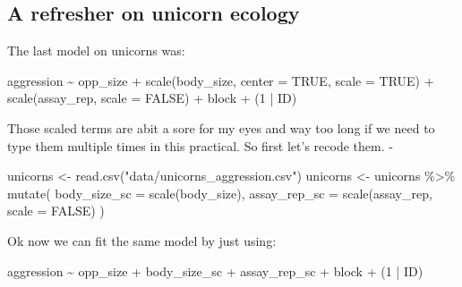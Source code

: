 \documentclass[
  12pt,
]{book}
\newenvironment{Shaded}{\begin{snugshade}}{\end{snugshade}}
\newcommand{\AttributeTok}[1]{\textcolor[rgb]{0.77,0.63,0.00}{#1}}
\newcommand{\ConstantTok}[1]{\textcolor[rgb]{0.00,0.00,0.00}{#1}}
\newcommand{\DecValTok}[1]{\textcolor[rgb]{0.00,0.00,0.81}{#1}}
\newcommand{\FunctionTok}[1]{\textcolor[rgb]{0.00,0.00,0.00}{#1}}
\newcommand{\NormalTok}[1]{#1}
\newcommand{\OtherTok}[1]{\textcolor[rgb]{0.56,0.35,0.01}{#1}}
\newcommand{\SpecialCharTok}[1]{\textcolor[rgb]{0.00,0.00,0.00}{#1}}
\newcommand{\StringTok}[1]{\textcolor[rgb]{0.31,0.60,0.02}{#1}}
\begin{document}
\hypertarget{a-refresher-on-unicorn-ecology}{%
\subsection{A refresher on unicorn ecology}\label{a-refresher-on-unicorn-ecology}}

The last model on unicorns was:

\begin{Shaded}
\begin{Highlighting}[]
\NormalTok{aggression }\SpecialCharTok{\textasciitilde{}}\NormalTok{ opp\_size }\SpecialCharTok{+} \FunctionTok{scale}\NormalTok{(body\_size, }\AttributeTok{center =} \ConstantTok{TRUE}\NormalTok{, }\AttributeTok{scale =} \ConstantTok{TRUE}\NormalTok{)}
              \SpecialCharTok{+} \FunctionTok{scale}\NormalTok{(assay\_rep, }\AttributeTok{scale =} \ConstantTok{FALSE}\NormalTok{) }\SpecialCharTok{+}\NormalTok{ block}
              \SpecialCharTok{+}\NormalTok{ (}\DecValTok{1} \SpecialCharTok{|}\NormalTok{ ID)}
\end{Highlighting}
\end{Shaded}

Those scaled terms are abit a sore for my eyes and way too long if we need to type them multiple times in this practical.
So first let's recode them.
-

\begin{Shaded}
\begin{Highlighting}[]
\NormalTok{unicorns }\OtherTok{\textless{}{-}} \FunctionTok{read.csv}\NormalTok{(}\StringTok{"data/unicorns\_aggression.csv"}\NormalTok{)}
\NormalTok{unicorns }\OtherTok{\textless{}{-}}\NormalTok{ unicorns }\SpecialCharTok{\%\textgreater{}\%}
  \FunctionTok{mutate}\NormalTok{(}
    \AttributeTok{body\_size\_sc =} \FunctionTok{scale}\NormalTok{(body\_size),}
    \AttributeTok{assay\_rep\_sc =} \FunctionTok{scale}\NormalTok{(assay\_rep, }\AttributeTok{scale =} \ConstantTok{FALSE}\NormalTok{)}
\NormalTok{  )}
\end{Highlighting}
\end{Shaded}

Ok now we can fit the same model by just using:

\begin{Shaded}
\begin{Highlighting}[]
\NormalTok{aggression }\SpecialCharTok{\textasciitilde{}}\NormalTok{ opp\_size }\SpecialCharTok{+}\NormalTok{ body\_size\_sc }\SpecialCharTok{+}\NormalTok{ assay\_rep\_sc }\SpecialCharTok{+}\NormalTok{ block}
              \SpecialCharTok{+}\NormalTok{ (}\DecValTok{1} \SpecialCharTok{|}\NormalTok{ ID)}
\end{Highlighting}
\end{Shaded}
\end{document}
